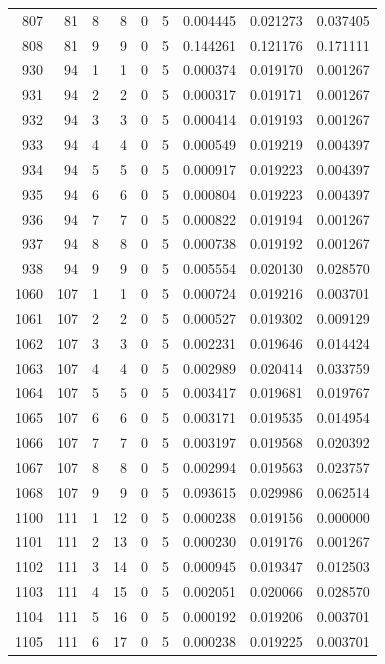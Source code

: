 \begin{longtable}{rrrrrrrrr}
807 & 81 & 8 & 8 & 0 & 5 & 0.004445 & 0.021273 & 0.037405 \\
808 & 81 & 9 & 9 & 0 & 5 & 0.144261 & 0.121176 & 0.171111 \\
930 & 94 & 1 & 1 & 0 & 5 & 0.000374 & 0.019170 & 0.001267 \\
931 & 94 & 2 & 2 & 0 & 5 & 0.000317 & 0.019171 & 0.001267 \\
932 & 94 & 3 & 3 & 0 & 5 & 0.000414 & 0.019193 & 0.001267 \\
933 & 94 & 4 & 4 & 0 & 5 & 0.000549 & 0.019219 & 0.004397 \\
934 & 94 & 5 & 5 & 0 & 5 & 0.000917 & 0.019223 & 0.004397 \\
935 & 94 & 6 & 6 & 0 & 5 & 0.000804 & 0.019223 & 0.004397 \\
936 & 94 & 7 & 7 & 0 & 5 & 0.000822 & 0.019194 & 0.001267 \\
937 & 94 & 8 & 8 & 0 & 5 & 0.000738 & 0.019192 & 0.001267 \\
938 & 94 & 9 & 9 & 0 & 5 & 0.005554 & 0.020130 & 0.028570 \\
1060 & 107 & 1 & 1 & 0 & 5 & 0.000724 & 0.019216 & 0.003701 \\
1061 & 107 & 2 & 2 & 0 & 5 & 0.000527 & 0.019302 & 0.009129 \\
1062 & 107 & 3 & 3 & 0 & 5 & 0.002231 & 0.019646 & 0.014424 \\
1063 & 107 & 4 & 4 & 0 & 5 & 0.002989 & 0.020414 & 0.033759 \\
1064 & 107 & 5 & 5 & 0 & 5 & 0.003417 & 0.019681 & 0.019767 \\
1065 & 107 & 6 & 6 & 0 & 5 & 0.003171 & 0.019535 & 0.014954 \\
1066 & 107 & 7 & 7 & 0 & 5 & 0.003197 & 0.019568 & 0.020392 \\
1067 & 107 & 8 & 8 & 0 & 5 & 0.002994 & 0.019563 & 0.023757 \\
1068 & 107 & 9 & 9 & 0 & 5 & 0.093615 & 0.029986 & 0.062514 \\
1100 & 111 & 1 & 12 & 0 & 5 & 0.000238 & 0.019156 & 0.000000 \\
1101 & 111 & 2 & 13 & 0 & 5 & 0.000230 & 0.019176 & 0.001267 \\
1102 & 111 & 3 & 14 & 0 & 5 & 0.000945 & 0.019347 & 0.012503 \\
1103 & 111 & 4 & 15 & 0 & 5 & 0.002051 & 0.020066 & 0.028570 \\
1104 & 111 & 5 & 16 & 0 & 5 & 0.000192 & 0.019206 & 0.003701 \\
1105 & 111 & 6 & 17 & 0 & 5 & 0.000238 & 0.019225 & 0.003701 \\

\end{longtable}
